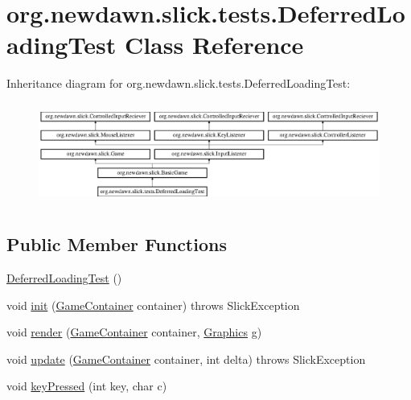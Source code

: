 \hypertarget{classorg_1_1newdawn_1_1slick_1_1tests_1_1_deferred_loading_test}{}\section{org.\+newdawn.\+slick.\+tests.\+Deferred\+Loading\+Test Class Reference}
\label{classorg_1_1newdawn_1_1slick_1_1tests_1_1_deferred_loading_test}
Inheritance diagram for org.\+newdawn.\+slick.\+tests.\+Deferred\+Loading\+Test\+:\begin{figure}[H]
\begin{center}
\leavevmode
\includegraphics[height=3.369434cm]{classorg_1_1newdawn_1_1slick_1_1tests_1_1_deferred_loading_test}
\end{center}
\end{figure}
\subsection*{Public Member Functions}
\begin{DoxyCompactItemize}
\item 
\mbox{\hyperlink{classorg_1_1newdawn_1_1slick_1_1tests_1_1_deferred_loading_test_a64e84e3546e18ba2accd4fc7d4a7e095}{Deferred\+Loading\+Test}} ()
\item 
void \mbox{\hyperlink{classorg_1_1newdawn_1_1slick_1_1tests_1_1_deferred_loading_test_afbf7c4dc257eafa02aeba102dc53ba6d}{init}} (\mbox{\hyperlink{classorg_1_1newdawn_1_1slick_1_1_game_container}{Game\+Container}} container)  throws Slick\+Exception 
\item 
void \mbox{\hyperlink{classorg_1_1newdawn_1_1slick_1_1tests_1_1_deferred_loading_test_a63cb8647f8d34261a12603edb3434d7f}{render}} (\mbox{\hyperlink{classorg_1_1newdawn_1_1slick_1_1_game_container}{Game\+Container}} container, \mbox{\hyperlink{classorg_1_1newdawn_1_1slick_1_1_graphics}{Graphics}} g)
\item 
void \mbox{\hyperlink{classorg_1_1newdawn_1_1slick_1_1tests_1_1_deferred_loading_test_ae78c3726c83239f31589f42dddacefdd}{update}} (\mbox{\hyperlink{classorg_1_1newdawn_1_1slick_1_1_game_container}{Game\+Container}} container, int delta)  throws Slick\+Exception 
\item 
void \mbox{\hyperlink{classorg_1_1newdawn_1_1slick_1_1tests_1_1_deferred_loading_test_a3567e13d0a687ead635e6ce96433c37e}{key\+Pressed}} (int key, char c)
\end{DoxyCompactItemize}
